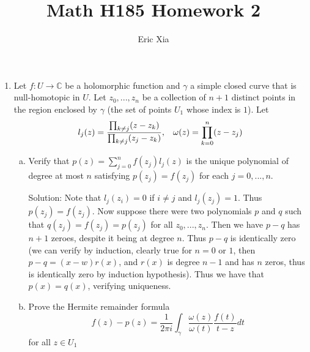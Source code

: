 \documentclass[11pt]{article}
\title{Math H185 Homework 2}
\author{Eric Xia}
\newcommand{\C}{\mathbb{C}}
\begin{document}
\maketitle

\begin{enumerate}[(1)]
\item Let $f:U\to\C$ be a holomorphic function and $\gamma$ a simple closed curve that is null-homotopic in $U$. Let $z_0, ..., z_n$ be a collection of $n+1$ distinct points in the region enclosed by $\gamma$ (the set of points $U_1$ whose index is $1$). Let 
$$ l_j(z) = \frac{\prod_{k \neq j} (z - z_k)}{\prod_{k\neq j}(z_j - z_k)}, \hspace{3mm} \omega(z) = \prod_{k=0}^n (z - z_j) $$

\begin{enumerate}[(a)]
\item Verify that $p(z) = \sum_{j=0}^n f(z_j)l_j(z)$ is the unique polynomial of degree at most $n$ satisfying $p(z_j) = f(z_j)$ for each $j= 0,...,n$.

\vspace{2mm}

Solution: Note that $l_j(z_i) = 0$ if $i \neq j$ and $l_j(z_j) = 1$. Thus $p(z_j) = f(z_j)$. Now suppose there were two polynomials $p$ and $q$ such that $q(z_j) = f(z_j) = p(z_j)$ for all $z_0, ..., z_n$. Then we have $p - q$ has $n+1$ zeroes, despite it being at degree $n$. Thus $p -q$ is identically zero (we can verify by induction, clearly true for $n = 0$ or $1$, then $p - q = (x - w)r(x)$, and $r(x)$ is degree $n-1$ and has $n$ zeros, thus is identically zero by induction hypothesis). Thus we have that $p(x) = q(x)$, verifying uniqueness.

\item Prove the Hermite remainder formula 
$$ f(z) - p(z) = \frac{1}{2\pi i} \int_\gamma \frac{\omega(z)}{\omega(t)} \frac{f(t)}{t-z} dt $$
for all $z \in U_1$


\end{enumerate}
\end{enumerate}
\end{document}
